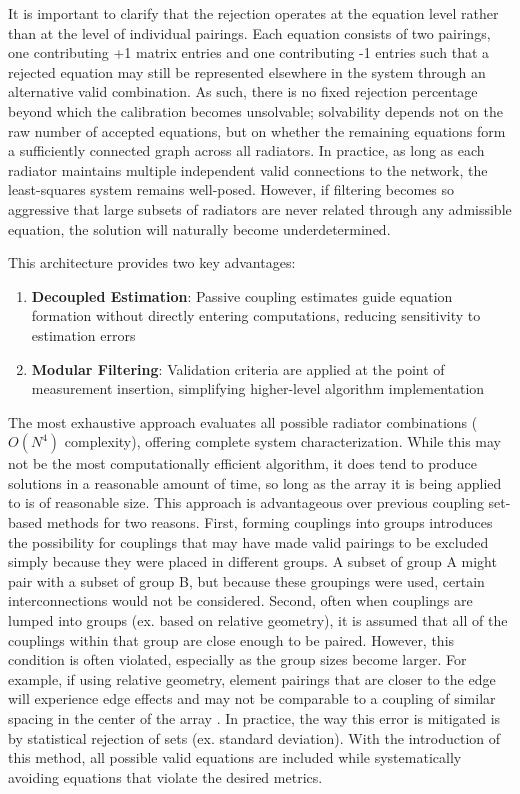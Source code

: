 \documentclass[journal]{IEEEtran}
\begin{document}
It is important to clarify that the rejection operates at the equation level rather than at the level of individual pairings. Each equation consists of two pairings, one contributing +1 matrix entries and one contributing -1 entries such that a rejected equation may still be represented elsewhere in the system through an alternative valid combination. As such, there is no fixed rejection percentage beyond which the calibration becomes unsolvable; solvability depends not on the raw number of accepted equations, but on whether the remaining equations form a sufficiently connected graph across all radiators. In practice, as long as each radiator maintains multiple independent valid connections to the network, the least-squares system remains well-posed. However, if filtering becomes so aggressive that large subsets of radiators are never related through any admissible equation, the solution will naturally become underdetermined.

This architecture provides two key advantages:

\begin{enumerate}
    \item \textbf{Decoupled Estimation}: Passive coupling estimates guide equation formation without directly entering computations, reducing sensitivity to estimation errors
    \item \textbf{Modular Filtering}: Validation criteria are applied at the point of measurement insertion, simplifying higher-level algorithm implementation
\end{enumerate}


The most exhaustive approach evaluates all possible radiator combinations ($O(N^4)$ complexity), offering complete system characterization. While this may not be the most computationally efficient algorithm, it does tend to produce solutions in a reasonable amount of time, so long as the array it is being applied to is of reasonable size. This approach is advantageous over previous coupling set-based methods for two reasons. First, forming couplings into groups introduces the possibility for couplings that may have made valid pairings to be excluded simply because they were placed in different groups. A subset of group A might pair with a subset of group B, but because these groupings were used, certain interconnections would not be considered. Second, often when couplings are lumped into groups (ex. based on relative geometry), it is assumed that all of the couplings within that group are close enough to be paired. However, this condition is often violated, especially as the group sizes become larger. For example, if using relative geometry, element pairings that are closer to the edge will experience edge effects and may not be comparable to a coupling of similar spacing in the center of the array \cite{javier,lebron,bekers,diagnostic,linder2025sub,sasser}. In practice, the way this error is mitigated is by statistical rejection of sets (ex. standard deviation). With the introduction of this method, all possible valid equations are included while systematically avoiding equations that violate the desired metrics. 
\end{document}
